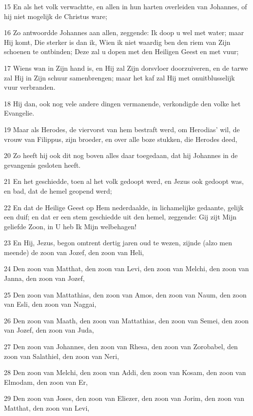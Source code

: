 \par 15 En als het volk verwachtte, en allen in hun harten overleiden van Johannes, of hij niet mogelijk de Christus ware;
\par 16 Zo antwoordde Johannes aan allen, zeggende: Ik doop u wel met water; maar Hij komt, Die sterker is dan ik, Wien ik niet waardig ben den riem van Zijn schoenen te ontbinden; Deze zal u dopen met den Heiligen Geest en met vuur;
\par 17 Wiens wan in Zijn hand is, en Hij zal Zijn dorsvloer doorzuiveren, en de tarwe zal Hij in Zijn schuur samenbrengen; maar het kaf zal Hij met onuitblusselijk vuur verbranden.
\par 18 Hij dan, ook nog vele andere dingen vermanende, verkondigde den volke het Evangelie.
\par 19 Maar als Herodes, de viervorst van hem bestraft werd, om Herodias' wil, de vrouw van Filippus, zijn broeder, en over alle boze stukken, die Herodes deed,
\par 20 Zo heeft hij ook dit nog boven alles daar toegedaan, dat hij Johannes in de gevangenis gesloten heeft.
\par 21 En het geschiedde, toen al het volk gedoopt werd, en Jezus ook gedoopt was, en bad, dat de hemel geopend werd;
\par 22 En dat de Heilige Geest op Hem nederdaalde, in lichamelijke gedaante, gelijk een duif; en dat er een stem geschiedde uit den hemel, zeggende: Gij zijt Mijn geliefde Zoon, in U heb Ik Mijn welbehagen!
\par 23 En Hij, Jezus, begon omtrent dertig jaren oud te wezen, zijnde (alzo men meende) de zoon van Jozef, den zoon van Heli,
\par 24 Den zoon van Matthat, den zoon van Levi, den zoon van Melchi, den zoon van Janna, den zoon van Jozef,
\par 25 Den zoon van Mattathias, den zoon van Amos, den zoon van Naum, den zoon van Esli, den zoon van Naggai,
\par 26 Den zoon van Maath, den zoon van Mattathias, den zoon van Semei, den zoon van Jozef, den zoon van Juda,
\par 27 Den zoon van Johannes, den zoon van Rhesa, den zoon van Zorobabel, den zoon van Salathiel, den zoon van Neri,
\par 28 Den zoon van Melchi, den zoon van Addi, den zoon van Kosam, den zoon van Elmodam, den zoon van Er,
\par 29 Den zoon van Joses, den zoon van Eliezer, den zoon van Jorim, den zoon van Matthat, den zoon van Levi,
